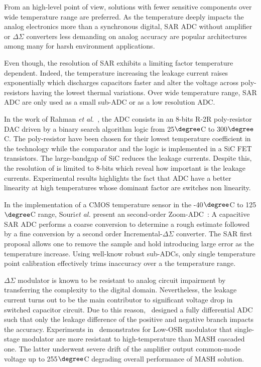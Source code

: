 From an high-level point of view, solutions with fewer sensitive components over wide temperature range are preferred. As the temperature deeply impacts the analog electronics more than a synchronous digital, SAR ADC without amplifier or \(\Delta\Sigma \) converters less demanding on analog accuracy are popular architectures among many for harsh environment applications.

Even though, the resolution of SAR exhibits a limiting factor temperature dependent. Indeed, the temperature increasing the leakage current raises exponentially which discharges capacitors faster and alter the voltage across poly-resistors having the lowest thermal variations. Over wide temperature range, SAR ADC are only used as a small sub-ADC or as a low resolution ADC\@. %

In the work of Rahman \textit{et al.}~\cite{Rahman2017}, the ADC consists in an 8-bits R-2R poly-resistor DAC driven by a binary search algorithm logic from 25\(\degree \)C to 300\(\degree \)C. The poly-resistor have been chosen for their lowest temperature coefficient in the technology while the comparator and the logic is implemented in a SiC FET transistors. The large-bandgap of SiC reduces the leakage currents. Despite this, the resolution of is limited to 8-bits which reveal how important is the leakage currents. Experimental results highlights the fact that ADC have a better linearity at high temperatures whose dominant factor are switches non linearity.

In the implementation of a CMOS temperature sensor in the -40\(\degree \)C to 125\(\degree \)C range, Souri\textit{et al.} present an second-order Zoom-ADC~\cite{Souri2014}: A capacitive SAR ADC performs a coarse conversion to determine a rough estimate followed by a fine conversion by a second order Incremental-\(\Delta\Sigma \) converter. The SAR first proposal allows one to remove the sample and hold introducing large error as the temperature increase. Using well-know robust sub-ADCs, only single temperature point calibration effectively trims inaccuracy over a the temperature range.

\(\Delta\Sigma \) modulator is known to be resistant to analog circuit impairment by transferring the complexity to the digital domain. Nevertheless, the leakage current turns out to be the main contributor to significant voltage drop in switched capacitor circuit. Due to this reason,~\cite{Davis2003} designed a fully differential ADC such that only the leakage difference of the positive and negative branch impacts the accuracy. Experiments in~\cite{Davis2003} demonstrates for Low-OSR modulator that single-stage modulator are more resistant to high-temperature than MASH cascaded one. The latter underwent severe drift of the amplifier output common-mode voltage up to 255\(\degree \)C degrading overall performance of MASH solution.

